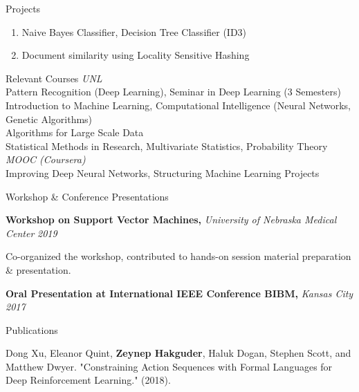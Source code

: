 \documentclass{resume} %
\newenvironment{cvEnum}
{ \begin{enumerate}[]
    \setlength{\itemsep}{0pt}
    \setlength{\parskip}{0pt}
    \setlength{\parsep}{0pt}     }
{ \end{enumerate}                  }
\begin{document}
\begin{rSection}{Projects}
\begin{cvEnum}
      \end{cvEnum}
\begin{cvEnum}
    \item Naive Bayes Classifier, Decision Tree Classifier (ID3)
    \item Document similarity using Locality Sensitive Hashing
    \end{cvEnum}


\end{rSection}




\begin{rSection}{Relevant Courses}
{\em UNL}\\
Pattern Recognition (Deep Learning), Seminar in Deep Learning (3 Semesters)
\\Introduction to Machine Learning, Computational Intelligence (Neural Networks, Genetic Algorithms)
\\Algorithms for Large Scale Data
\\Statistical Methods in Research, Multivariate Statistics, Probability Theory\\
{\em MOOC (Coursera)}\\
Improving Deep Neural Networks, Structuring Machine Learning Projects
\end{rSection}




\begin{rSection}{Workshop \& Conference Presentations}

{\bf Workshop on Support Vector Machines,} {\em University of Nebraska Medical Center} \hfill{\em 2019}
\begin{cvEnum}
    Co-organized the workshop, contributed to hands-on session material preparation \& presentation.
\end{cvEnum}
{\bf Oral Presentation at International IEEE Conference BIBM,} {\em Kansas City} \hfill{\em 2017}
\end{rSection}
\begin{rSection}{Publications}

\end{rSection}
Dong Xu, Eleanor Quint, {\bf Zeynep Hakguder}, Haluk Dogan, Stephen Scott, and Matthew Dwyer. "Constraining Action Sequences with Formal Languages for Deep Reinforcement Learning." (2018).
\vspace*{0.05cm}
\end{document}
